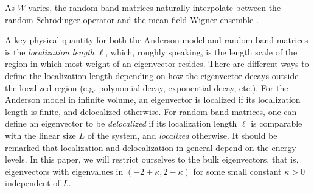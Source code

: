 \documentclass{article}
\newcommand{\1}{\mathds{1}}
\numberwithin{equation}{section}
\newcommand{\be}{\begin{equation}}
\newcommand{\ee}{\end{equation}}
\theoremstyle{plain} %
\theoremstyle{remark}
\begin{document}
As $W$ varies, the random band matrices naturally interpolate between the random Schr\"odinger operator  \cite{Anderson}
and the mean-field Wigner  ensemble \cite{Wigner}. %


A key physical quantity for both the Anderson model and random band matrices is the \emph{localization length} $\ell$, which, roughly speaking, is the length scale of the region in which most weight of an eigenvector resides. There are different ways to define the localization length depending on how the eigenvector decays outside the localized region (e.g. polynomial decay, exponential decay, etc.). %
For the Anderson model in infinite volume, an eigenvector is localized if its localization length is finite, and delocalized otherwise. 
For random band matrices, one can define an eigenvector to be \emph{delocalized} if its localization length $\ell$ is comparable with the linear size $L$ of the system, and \emph{localized} otherwise. It should be remarked that localization and delocalization in general depend on the energy levels. 
In this paper, we will restrict ourselves to the bulk eigenvectors, that is, eigenvectors with   eigenvalues in $(-2+ \kappa, 2-\kappa)$ for some small constant $\kappa>0$ independent of $L$. 
\end{document}
